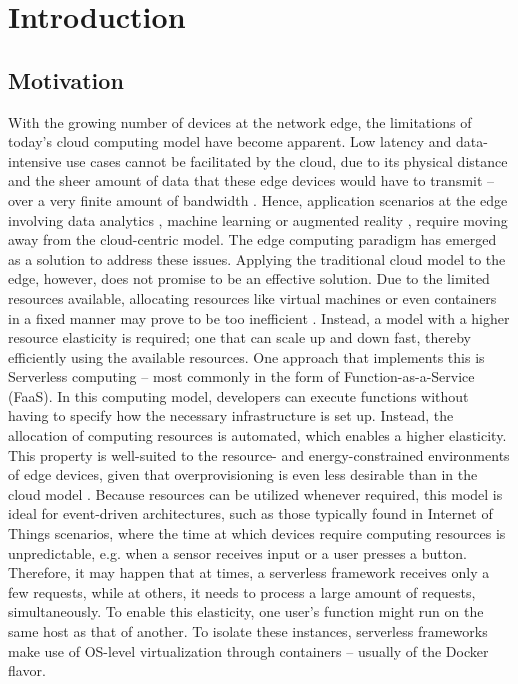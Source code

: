 \chapter{Introduction}
\label{chapter:introduction}

\section{Motivation}

With the growing number of devices at the network edge, the limitations of today's cloud computing model have become apparent. Low latency and data-intensive use cases cannot be facilitated by the cloud, due to its physical distance and the sheer amount of data that these edge devices would have to transmit -- over a very finite amount of bandwidth \cite{Aslanpour2021}.
Hence, application scenarios at the edge involving data analytics \cite{Nastic2017}, machine learning \cite{Rausch2019} or augmented reality \cite{Baresi2019}, require moving away from the cloud-centric model.
The edge computing paradigm has emerged as a solution to address these issues.
Applying the traditional cloud model to the edge, however, does not promise to be an effective solution. Due to the limited resources available, allocating resources like virtual machines or even containers in a fixed manner may prove to be too inefficient \cite{Baresi2019}.
Instead, a model with a higher resource elasticity is required; one that can scale up and down fast, thereby efficiently using the available resources.
One approach that implements this is Serverless computing -- most commonly in the form of Function-as-a-Service (FaaS).
In this computing model, developers can execute functions without having to specify how the necessary infrastructure is set up. Instead, the allocation of computing resources is automated, which enables a higher elasticity. This property is well-suited to the resource- and energy-constrained environments of edge devices, given that overprovisioning is even less desirable than in the cloud model \cite{Aslanpour2021}.
Because resources can be utilized whenever required, this model is ideal for event-driven architectures, such as those typically found in Internet of Things scenarios, where the time at which devices require computing resources is unpredictable, e.g. when a sensor receives input or a user presses a button. Therefore, it may happen that at times, a serverless framework receives only a few requests, while at others, it needs to process a large amount of requests, simultaneously.
To enable this elasticity, one user's function might run on the same host as that of another. To isolate these instances, serverless frameworks make use of OS-level virtualization through containers -- usually of the Docker flavor.
